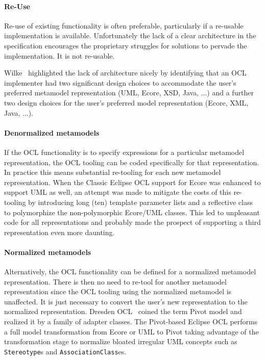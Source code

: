 \documentclass{jot}
\begin{document}
\paragraph{Re-Use} Re-use of existing functionality is often preferable, particularly if a re-usable implementation is available. Unfortunately the lack of a clear architecture in the specification encourages the proprietary struggles for solutions to pervade the implementation. It is not re-usable.

Wilke~\cite{Wilke-Variability} highlighted the lack of architecture nicely by identifying that an OCL implementer had two significant design choices to accommodate the user's preferred metamodel representation (UML, Ecore, XSD, Java, ...) and a further two design choices for the user's preferred model representation (Ecore, XML, Java, ...).

\paragraph{Denormalized metamodels} If the OCL functionality is to specify expressions for a particular metamodel representation, the OCL tooling can be coded specifically for that representation. In practice this means substantial re-tooling for each new metamodel representation. When the Classic Eclipse OCL support for Ecore was enhanced to support UML as well, an attempt was made to mitigate the costs of this re-tooling by introducing long (ten) template parameter lists and a reflective class to polymorphize the non-polymorphic Ecore/UML classes. This led to unpleasant code for all representations and probably made the prospect of supporting a third representation even more daunting.

\paragraph{Normalized metamodels} Alternatively, the OCL functionality can be defined for a normalized metamodel representation. There is then no need to re-tool for another metamodel representation since the OCL tooling using the normalized metamodel is unaffected. It is just necessary to convert the user's new representation to the normalized representation. Dresden OCL~\cite{Dresden-OCL} coined the term Pivot model and realized it by a family of adapter classes. The Pivot-based Eclipse OCL performs a full model transformation from Ecore or UML to Pivot taking advantage of the transformation stage to normalize bloated irregular UML concepts such as \verb$Stereotype$s and \verb$AssociationClass$es.
\end{document}
